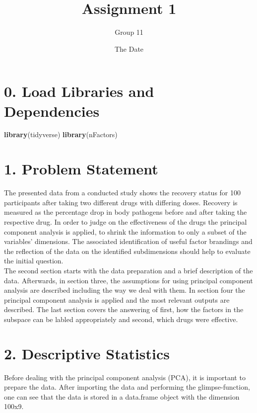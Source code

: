 \documentclass[]{article}
\title{Assignment 1}
\author{Group 11}
\date{The Date}
\newenvironment{Shaded}{\begin{snugshade}}{\end{snugshade}}
\newcommand{\KeywordTok}[1]{\textcolor[rgb]{0.13,0.29,0.53}{\textbf{#1}}}
\newcommand{\NormalTok}[1]{#1}
\begin{document}
\maketitle

\section{0. Load Libraries and Dependencies}

\begin{Shaded}
\begin{Highlighting}[]
\KeywordTok{library}\NormalTok{(tidyverse)}
\KeywordTok{library}\NormalTok{(nFactors)}
\end{Highlighting}
\end{Shaded}

\section{1. Problem Statement}

The presented data from a conducted study shows the recovery status for
100 participants after taking two different drugs with differing doses.
Recovery is measured as the percentage drop in body pathogens before and
after taking the respective drug. In order to judge on the effectiveness
of the drugs the principal component analysis is applied, to shrink the
information to only a subset of the variables' dimensions. The
associated identification of useful factor brandings and the reflection
of the data on the identified subdimensions should help to evaluate the
initial question.\\
The second section starts with the data preparation and a brief
description of the data. Afterwards, in section three, the assumptions
for using principal component analysis are described including the way
we deal with them. In section four the principal component analysis is
applied and the most relevant outputs are described. The last section
covers the answering of first, how the factors in the subspace can be
labled appropriately and second, which drugs were effective.

\section{2. Descriptive Statistics}

Before dealing with the principal component analysis (PCA), it is
important to prepare the data. After importing the data and performing
the glimpse-function, one can see that the data is stored in a
data.frame object with the dimension 100x9.
\end{document}
